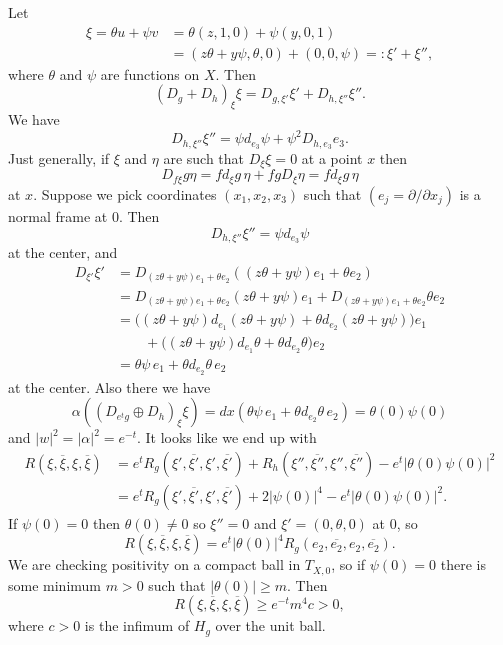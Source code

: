 \documentclass[11pt]{article}
\theoremstyle{definition}
\def\ov#1{\overline{#1}}
\begin{document}
Let
\begin{align*}
\xi = \theta u + \psi v
&= \theta (z, 1, 0) + \psi (y, 0, 1)
\\
&= (z \theta + y \psi, \theta, 0) + (0, 0, \psi)
=: \xi' + \xi'',
\end{align*}
where $\theta$ and $\psi$ are functions on $X$.
Then
$$
(D_g + D_h)_\xi \xi
= D_{g,\xi'}\xi' + D_{h,\xi''} \xi''.
$$
We have
$$
D_{h,\xi''} \xi''
= \psi d_{e_3} \psi + \psi^2 D_{h,e_3} e_3.
$$
Just generally, if $\xi$ and $\eta$ are such that $D_\xi \xi = 0$ at a point $x$
then
$$
D_{f \xi} g \eta = f d_\xi g \, \eta + fg D_\xi \eta = f d_\xi g \, \eta
$$
at $x$.
Suppose we pick coordinates $(x_1,x_2,x_3)$ such that $(e_j = \partial
/ \partial x_j)$ is a normal frame at $0$. Then
$$
D_{h,\xi''} \xi''
= \psi d_{e_3} \psi
$$
at the center, and
\begin{align*}
D_{\xi'} \xi'
&= D_{(z\theta + y\psi)e_1 + \theta e_2}((z\theta + y\psi)e_1 + \theta e_2)
\\
&= D_{(z\theta + y\psi)e_1 + \theta e_2}(z\theta + y\psi)e_1
+ D_{(z\theta + y\psi)e_1 + \theta e_2}\theta e_2
\\
&= \bigl(
(z\theta + y\psi)d_{e_1}(z\theta + y\psi)
+ \theta d_{e_2}(z\theta + y\psi)
\bigr) e_1
\\
&\qquad
+ \bigl(
(z\theta + y\psi)d_{e_1}\theta
+ \theta d_{e_2}\theta
\bigr) e_2
\\
&=
\theta \psi \, e_1
+ \theta d_{e_2}\theta
\, e_2
\end{align*}
at the center.
Also there we have
$$
\alpha((D_{e^t g} \oplus D_h)_\xi \xi)
= dx(\theta \psi \, e_1
+ \theta d_{e_2}\theta
\, e_2)
= \theta(0) \psi(0)
$$
and $|w|^2 = |\alpha|^2 = e^{-t}$.
It looks like we end up with
\begin{align*}
R(\xi, \ov\xi, \xi, \ov\xi)
&= e^t R_g(\xi', \ov{\xi'}, \xi', \ov{\xi'})
+ R_h(\xi'', \ov{\xi''}, \xi'', \ov{\xi''})
- e^t |\theta(0) \psi(0)|^2
\\
&= e^t R_g(\xi', \ov{\xi'}, \xi', \ov{\xi'})
+ 2 |\psi(0)|^4
- e^t |\theta(0) \psi(0)|^2.
\end{align*}
If $\psi(0) = 0$ then $\theta(0) \not= 0$
so $\xi'' = 0$ and $\xi' = (0, \theta, 0)$ at $0$, so
$$
R(\xi, \ov\xi, \xi, \ov\xi)
= e^t |\theta(0)|^4 R_g(e_2, \ov{e_2}, e_2, \ov{e_2}).
$$
We are checking positivity on a compact ball in $T_{X,0}$, so if $\psi(0) = 0$
there is some minimum $m > 0$ such that $|\theta(0)| \geq m$. Then
$$
R(\xi, \ov\xi, \xi, \ov\xi)
\geq e^{-t} m^4 c > 0,
$$
where $c > 0$ is the infimum of $H_g$ over the unit ball.
\end{document}

